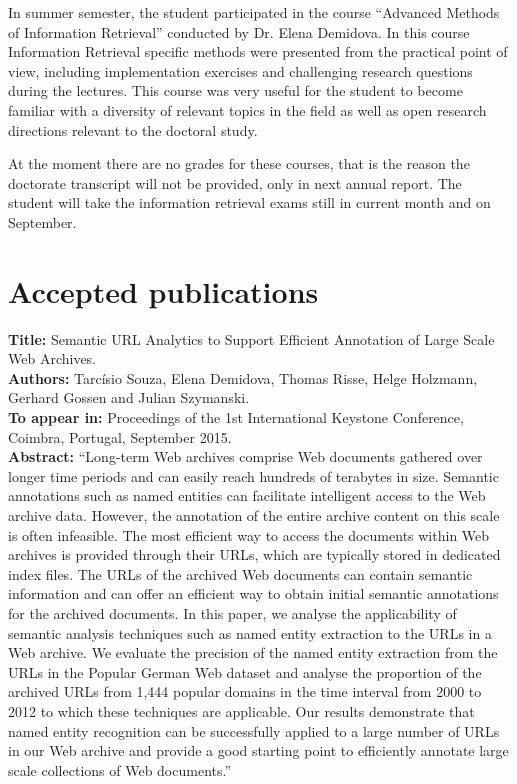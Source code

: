 \documentclass[a4paper,11pt]{report}
\begin{document}
In summer semester, the student participated in the course 
``Advanced Methods of Information Retrieval'' conducted by Dr. Elena Demidova. In this course
Information Retrieval specific methods were presented from the practical point of view, 
including implementation exercises and challenging research questions during the lectures.
This course was very useful for the student to become familiar with a diversity
of relevant topics in the field as well as open research directions relevant to the doctoral
study.

At the moment there are no grades for these courses, that is the reason the
doctorate transcript will not be provided, only in next annual report. The
student will take the information retrieval exams still in current month and
on September.
\section{Accepted publications}

\textbf{Title:} Semantic URL Analytics to Support Efficient Annotation of Large Scale Web Archives. \\
\textbf{Authors:} Tarcísio Souza, Elena Demidova, Thomas Risse, Helge Holzmann, Gerhard Gossen and Julian Szymanski. \\
\textbf{To appear in:} Proceedings of the 1st International Keystone Conference, Coimbra, Portugal, September 2015.\\
\textbf{Abstract:}
``Long-term Web archives comprise Web documents gathered over longer time periods and can easily reach hundreds of terabytes in size.
Semantic annotations such as named entities can facilitate intelligent access to the Web archive data. 
However, the annotation of the entire archive content on this scale is often infeasible. The most efficient way to access the documents within Web archives is provided through their URLs, which are typically stored in 
dedicated index files. The URLs of the archived Web documents can contain
semantic information and can offer an efficient way to obtain initial semantic annotations for the archived documents. 
In this paper, we analyse the applicability of semantic analysis techniques such as named entity extraction
to the URLs in a Web archive. We evaluate the precision of the named entity
extraction from the URLs in the Popular German Web dataset and analyse the
proportion of the archived URLs from 1,444 popular domains in the time interval from 2000 to 2012 to which these techniques are applicable.
Our results demonstrate that named entity recognition can be successfully applied to a large number of URLs in 
our Web archive and provide a good starting point to efficiently annotate large scale collections of Web documents.''
\end{document}
